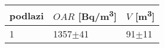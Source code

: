 \begin{tabular}{lll}
\toprule
podlazi & $OAR$ [\si{Bq/m^3}] & $V$ [\si{m^3}] \\
\midrule
1 &           1357$\pm$41 &        91$\pm$11 \\
\bottomrule
\end{tabular}
